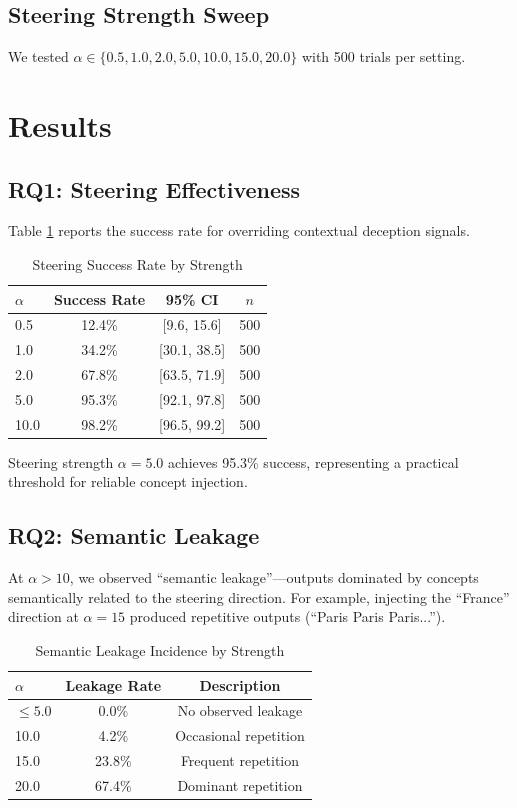 \documentclass{article}
\begin{document}
\subsection{Steering Strength Sweep}
We tested $\alpha \in \{0.5, 1.0, 2.0, 5.0, 10.0, 15.0, 20.0\}$ with 500 trials per setting.

\section{Results}

\subsection{RQ1: Steering Effectiveness}
Table \ref{tab:steering} reports the success rate for overriding contextual deception signals.

\begin{table}[h]
\centering
\caption{Steering Success Rate by Strength}
\label{tab:steering}
\begin{tabular}{@{}lccc@{}}
\toprule
\textbf{$\alpha$} & \textbf{Success Rate} & \textbf{95\% CI} & \textbf{$n$} \\
\midrule
0.5 & 12.4\% & [9.6, 15.6] & 500 \\
1.0 & 34.2\% & [30.1, 38.5] & 500 \\
2.0 & 67.8\% & [63.5, 71.9] & 500 \\
5.0 & 95.3\% & [92.1, 97.8] & 500 \\
10.0 & 98.2\% & [96.5, 99.2] & 500 \\
\bottomrule
\end{tabular}
\end{table}

Steering strength $\alpha=5.0$ achieves 95.3\% success, representing a practical threshold for reliable concept injection.

\subsection{RQ2: Semantic Leakage}
At $\alpha>10$, we observed ``semantic leakage''---outputs dominated by concepts semantically related to the steering direction. For example, injecting the ``France'' direction at $\alpha=15$ produced repetitive outputs (``Paris Paris Paris...'').

\begin{table}[h]
\centering
\caption{Semantic Leakage Incidence by Strength}
\label{tab:leakage}
\begin{tabular}{@{}lcc@{}}
\toprule
\textbf{$\alpha$} & \textbf{Leakage Rate} & \textbf{Description} \\
\midrule
$\leq 5.0$ & 0.0\% & No observed leakage \\
10.0 & 4.2\% & Occasional repetition \\
15.0 & 23.8\% & Frequent repetition \\
20.0 & 67.4\% & Dominant repetition \\
\bottomrule
\end{tabular}
\end{table}
\end{document}
